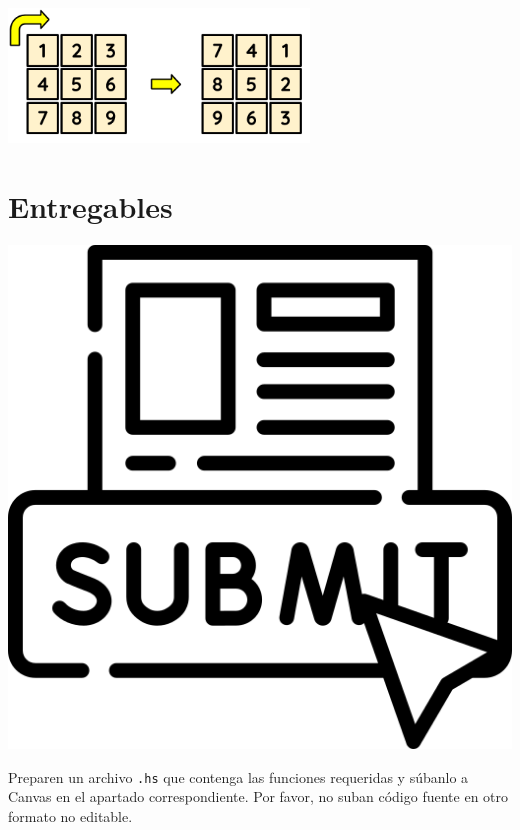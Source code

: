 \documentclass[]{article}
\theoremstyle{definition}
\begin{document}
\begin{center}
	\includegraphics[width=0.6\textwidth]{../img/Rotate}
\end{center}

\vspace{10ex}

\section*{Entregables}

\bigskip

\begin{minipage}{0.1\linewidth}
	\centering
	\includegraphics[scale = 0.06]{../img/submit}
\end{minipage}%
\begin{minipage}{0.85\linewidth}
	Preparen un archivo \texttt{.hs} que contenga las funciones requeridas y súbanlo a Canvas en el apartado correspondiente.
	Por favor, no suban código fuente en otro formato no editable.
\end{minipage}
\end{document}
